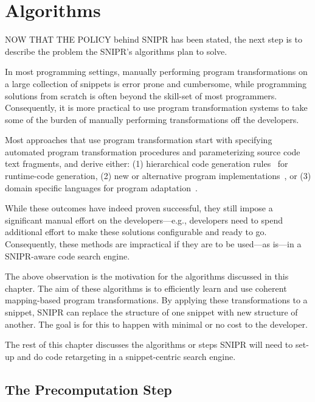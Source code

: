 \chapter{Algorithms}{}
\label{chap:algorithms}

\lettrine[lraise=0.1, nindent=0em, slope=-.5em]{N}{OW THAT THE POLICY} behind \uppercase{SNIPR} has been stated, the next step is to describe the problem the SNIPR's algorithms plan to solve.

In most programming settings, manually performing program transformations on a large collection of snippets is error prone and cumbersome, while programming solutions from scratch is often beyond the skill-set of most programmers. Consequently, it is more practical to use program transformation systems to take some of the burden of manually performing transformations off the developers.

Most approaches that use program transformation start with specifying automated program transformation procedures and parameterizing source code text fragments, and derive either: (1) hierarchical code generation rules~\cite{Nita:2010en} for runtime-code generation, (2) new or alternative program implementations~\cite{Wightman:2012gc}, or (3) domain specific languages for program adaptation~\cite{Visser:2001tc}.

While these outcomes have indeed proven successful, they still impose a significant manual effort on the developers---e.g., developers need to spend additional effort to make these solutions configurable and ready to go. Consequently, these methods are impractical if they are to be used---as is---in a \uppercase{SNIPR}-aware code search engine. 

The above observation is the motivation for the algorithms discussed in this chapter. The aim of these algorithms is to efficiently learn and use coherent mapping-based program transformations. By applying these transformations to a snippet, \uppercase{SnipR} can replace the structure of one snippet with new structure of another. The goal is for this to happen with minimal or no cost to the developer. 

The rest of this chapter discusses the algorithms or steps \uppercase{SnipR} will need to set-up and do code retargeting in a snippet-centric search engine.

\section{The Precomputation Step}
\label{sec:precomputation}

